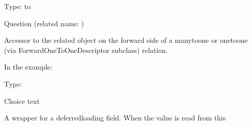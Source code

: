 \documentclass[letterpaper,10pt,russian]{sphinxmanual}
\begin{document}
\begin{fulllineitems}
\begin{quote}
\begin{description}
\end{description}\end{quote}

\begin{fulllineitems}
\label{\detokenize{myapp:polls.models.Choice.question}}
\pysigstartsignatures
\pysigline
{}
\pysigstopsignatures
\sphinxAtStartPar
Type:  to {\hyperref[\detokenize{myapp:polls.models.Question}]{}}

\sphinxAtStartPar
Question (related name: )

\sphinxAtStartPar
Accessor to the related object on the forward side of a many\sphinxhyphen{}to\sphinxhyphen{}one or
one\sphinxhyphen{}to\sphinxhyphen{}one (via ForwardOneToOneDescriptor subclass) relation.

\sphinxAtStartPar
In the example:

\begin{sphinxVerbatim}[commandchars=\\\{\}]
       
\end{sphinxVerbatim}

\end{fulllineitems}


\begin{fulllineitems}
\label{\detokenize{myapp:polls.models.Choice.choice_text}}
\pysigstartsignatures
\pysigline
{}
\pysigstopsignatures
\sphinxAtStartPar
Type: 

\sphinxAtStartPar
Choice text

\sphinxAtStartPar
A wrapper for a deferred\sphinxhyphen{}loading field. When the value is read from this


\end{fulllineitems}
\end{fulllineitems}
\end{document}

